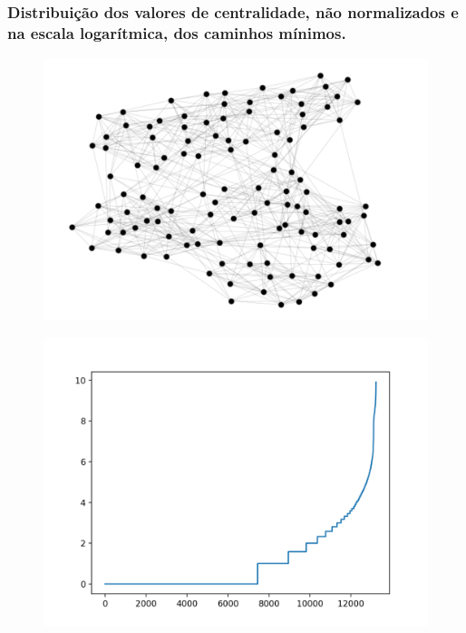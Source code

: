 \documentclass{beamer}
\begin{document}
        \begin{frame}
            \frametitle{Distribuição dos valores de centralidade, não normalizados e na escala logarítmica, dos caminhos mínimos.}
            \begin{minipage}{\textwidth}
                \begin{minipage}[b]{0.49\textwidth}
                    \begin{figure}
                        \centering
                        \includegraphics[scale=0.25]{american-football.png}
                    \end{figure}
                \end{minipage}
                \hfill
                \begin{minipage}[b]{0.49\textwidth}
                    \begin{figure}
                        \centering
                        \includegraphics[scale=0.3]{short_path_centrality_ex3_log.png}
                    \end{figure}
                \end{minipage}
            \end{minipage}
        \end{frame}
\end{document}

